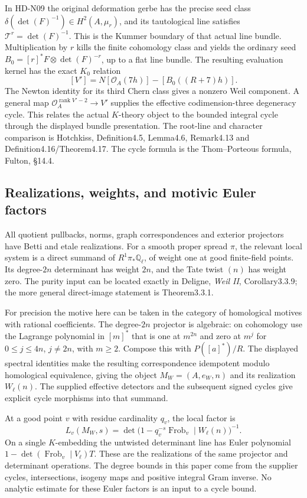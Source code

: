 In HD-N09 the original deformation gerbe has the precise seed class
$\delta(\det(F)^{-1})\in H^2(A,\mu_r)$, and its tautological line
satisfies $\mathcal T^r=\det(F)^{-1}$. This is the Kummer boundary
of that actual line bundle. Multiplication by $r$ kills the finite
cohomology class and yields the ordinary seed
$B_0=[r]^*F\otimes\det(F)^{-r}$, up to a flat line bundle.
The resulting evaluation kernel has the exact $K_0$ relation
\[
 [V']=N[\mathcal O_A(7h)]-[B_0((R+7)h)].
\]
The Newton identity for its third Chern class gives a nonzero Weil
component. A general map
$\mathcal O_A^{\operatorname{rank}V'-2}\to V'$ supplies the effective
codimension-three degeneracy cycle. This relates the actual
$K$-theory object to the bounded integral cycle through the
displayed bundle presentation. The root-line and character comparison
is Hotchkiss, Definition4.5, Lemma4.6, Remark4.13 and
Definition4.16/Theorem4.17. The cycle formula is the
Thom--Porteous formula, Fulton, \S14.4.

\subsection{Realizations, weights, and motivic Euler factors}

All quotient pullbacks, norms, graph correspondences and exterior
projectors have Betti and etale realizations. For a smooth proper
spread $\pi$, the relevant local system is a direct summand of
$R^1\pi_*\mathbb Q_\ell$, of weight one at good finite-field points.
Its degree-$2n$ determinant has weight $2n$, and the Tate twist $(n)$
has weight zero. The purity input can be located exactly in Deligne,
\emph{Weil II}, Corollary3.3.9; the more general direct-image statement
is Theorem3.3.1.

For precision the motive here can be taken in the category of
homological motives with rational coefficients. The degree-$2n$
projector is algebraic: on cohomology use the Lagrange polynomial in
$[m]^*$ that is one at $m^{2n}$ and zero at $m^j$ for
$0\le j\le4n$, $j\ne2n$, with $m\ge2$.
Compose this with $P([a]^*)/R$.
The displayed spectral identities make the resulting correspondence
idempotent modulo homological equivalence, giving the object
$M_W=(A,e_W,n)$ and its realization $W_\ell(n)$.
The supplied effective detectors and the subsequent signed cycles
give explicit cycle morphisms into that summand.

At a good point $v$ with residue cardinality $q_v$, the local factor is
\[
 L_v(M_W,s)=
 \det\bigl(1-q_v^{-s}\operatorname{Frob}_v
       \mid W_\ell(n)\bigr)^{-1}.
\]
On a single $K$-embedding the untwisted determinant line has Euler
polynomial $1-\det(\operatorname{Frob}_v\mid V_\ell)T$.
These are the realizations of the same projector and determinant
operations. The degree bounds in this paper come from the supplier
cycles, intersections, isogeny maps and positive integral Gram inverse.
No analytic estimate for these Euler factors is an input to a cycle
bound.

